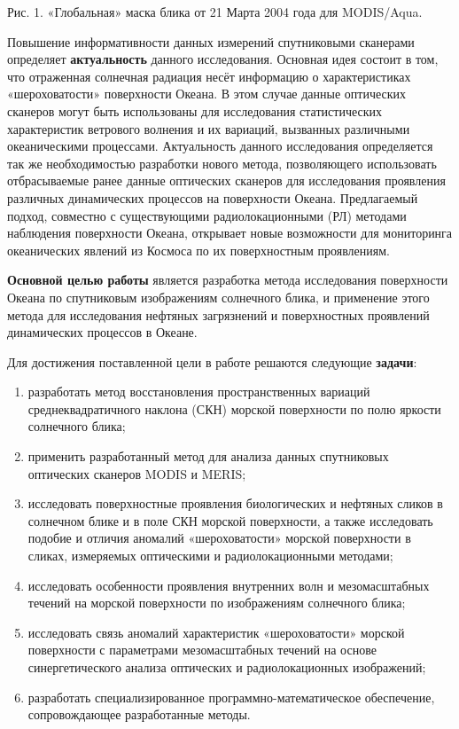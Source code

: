 Рис. 1. «Глобальная» маска блика от 21 Марта 2004 года для MODIS/Aqua.



Повышение информативности данных измерений спутниковыми сканерами определяет \textbf{актуальность} данного исследования. Основная идея состоит в том, что отраженная солнечная радиация несёт информацию о характеристиках «шероховатости» поверхности Океана. В этом случае данные оптических сканеров могут быть использованы для исследования статистических характеристик ветрового волнения и их вариаций, вызванных различными океаническими процессами. Актуальность данного исследования определяется так же необходимостью разработки нового метода, позволяющего использовать отбрасываемые ранее данные оптических сканеров для исследования проявления различных динамических процессов на поверхности Океана. Предлагаемый подход, совместно с существующими радиолокационными (РЛ) методами наблюдения поверхности Океана, открывает новые возможности для мониторинга океанических явлений из Космоса по их поверхностным проявлениям.

\textbf{Основной целью работы} является разработка метода исследования поверхности Океана по спутниковым изображениям солнечного блика, и применение этого метода для исследования нефтяных загрязнений и поверхностных проявлений динамических процессов в Океане.

Для достижения поставленной цели в работе решаются следующие \textbf{задачи}:

\begin{enumerate}
\item  разработать метод восстановления пространственных вариаций среднеквадратичного наклона (СКН) морской поверхности по полю яркости солнечного блика;

\item  применить разработанный метод для анализа данных спутниковых оптических сканеров MODIS и MERIS;

\item  исследовать поверхностные проявления биологических и нефтяных сликов в солнечном блике и в поле СКН морской поверхности, а также исследовать подобие и отличия аномалий «шероховатости» морской поверхности в сликах, измеряемых оптическими и радиолокационными методами;

\item  исследовать особенности проявления внутренних волн и мезомасштабных течений на морской поверхности по изображениям солнечного блика;

\item  исследовать связь аномалий характеристик «шероховатости» морской поверхности с параметрами мезомасштабных течений на основе синергетического анализа оптических и радиолокационных изображений;

\item  разработать специализированное программно-математическое обеспечение, сопровождающее разработанные методы.
\end{enumerate}

